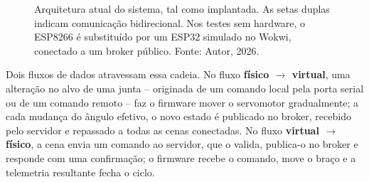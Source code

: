 \documentclass[12pt]{article}
\begin{document}
\begin{figure}[htbp]
{%
    }
    \caption{Arquitetura atual do sistema, tal como implantada. As setas duplas indicam comunicação bidirecional. Nos testes sem hardware, o ESP8266 é substituído por um ESP32 simulado no Wokwi, conectado a um broker público. Fonte: Autor, 2026.}
    \label{fig:arquitetura}
\end{figure}

Dois fluxos de dados atravessam essa cadeia. No fluxo \textbf{físico $\rightarrow$ virtual}, uma alteração no alvo de uma junta -- originada de um comando local pela porta serial ou de um comando remoto -- faz o firmware mover o servomotor gradualmente; a cada mudança do ângulo efetivo, o novo estado é publicado no broker, recebido pelo servidor e repassado a todas as cenas conectadas. No fluxo \textbf{virtual $\rightarrow$ físico}, a cena envia um comando ao servidor, que o valida, publica-o no broker e responde com uma confirmação; o firmware recebe o comando, move o braço e a telemetria resultante fecha o ciclo.
\end{document}

